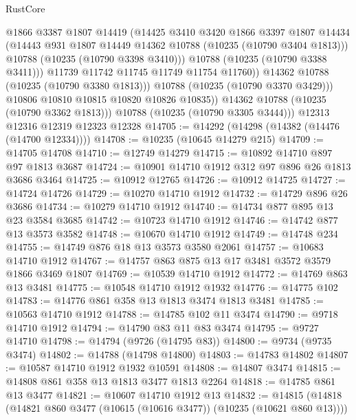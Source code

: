 \begin{lexlean}{RustCore}
\begin{coremodule}
                      @1866
                      @3387
                      @1807
                      @14419
                      (@14425
                        @3410
                        @3420
                        @1866
                        @3397
                        @1807
                        @14434
                        (@14443 @931 @1807 @14449 @14362 @10788 (@10235 (@10790 @3404 @1813)))
                        @10788
                        (@10235 (@10790 @3398 @3410)))
                      @10788
                      (@10235 (@10790 @3388 @3411)))
                    @11739
                    @11742
                    @11745
                    @11749
                    @11754
                    @11760))
                @14362
                @10788
                (@10235 (@10790 @3380 @1813)))
              @10788
              (@10235 (@10790 @3370 @3429)))
            @10806
            @10810
            @10815
            @10820
            @10826
            @10835))
        @14362
        @10788
        (@10235 (@10790 @3362 @1813)))
      @10788
      (@10235 (@10790 @3305 @3444)))
    @12313
    @12316
    @12319
    @12323
    @12328
@14705 := @14292 (@14298 (@14382 (@14476 (@14700 @12334))))
@14708 := @10235 (@10645 @14279 @215)
@14709 := @14705 @14708
@14710 := @12749 @14279
@14715 := @10892 @14710 @897 @97 @1813 @3687
@14724 := @10901 @14710 @1912 @312 @97 @896 @26 @1813 @3686 @3464
@14725 := @10912 @12765
@14726 := @10912 @14725
@14727 := @14724 @14726
@14729 := @10270 @14710 @1912
@14732 := @14729 @896 @26 @3686
@14734 := @10279 @14710 @1912
@14740 := @14734 @877 @895 @13 @23 @3584 @3685
@14742 := @10723 @14710 @1912
@14746 := @14742 @877 @13 @3573 @3582
@14748 := @10670 @14710 @1912
@14749 := @14748 @234
@14755 := @14749 @876 @18 @13 @3573 @3580 @2061
@14757 := @10683 @14710 @1912
@14767 := @14757 @863 @875 @13 @17 @3481 @3572 @3579 @1866 @3469 @1807
@14769 := @10539 @14710 @1912
@14772 := @14769 @863 @13 @3481
@14775 := @10548 @14710 @1912 @1932
@14776 := @14775 @102
@14783 := @14776 @861 @358 @13 @1813 @3474 @1813 @3481
@14785 := @10563 @14710 @1912
@14788 := @14785 @102 @11 @3474
@14790 := @9718 @14710 @1912
@14794 := @14790 @83 @11 @83 @3474
@14795 := @9727 @14710
@14798 := @14794 (@9726 (@14795 @83))
@14800 := @9734 (@9735 @3474)
@14802 := @14788 (@14798 @14800)
@14803 := @14783 @14802
@14807 := @10587 @14710 @1912 @1932 @10591
@14808 := @14807 @3474
@14815 := @14808 @861 @358 @13 @1813 @3477 @1813 @2264
@14818 := @14785 @861 @13 @3477
@14821 := @10607 @14710 @1912 @13
@14832 := @14815 (@14818 (@14821 @860 @3477 (@10615 (@10616 @3477)) (@10235 (@10621 @860 @13))))

\end{coremodule}
\end{lexlean}

